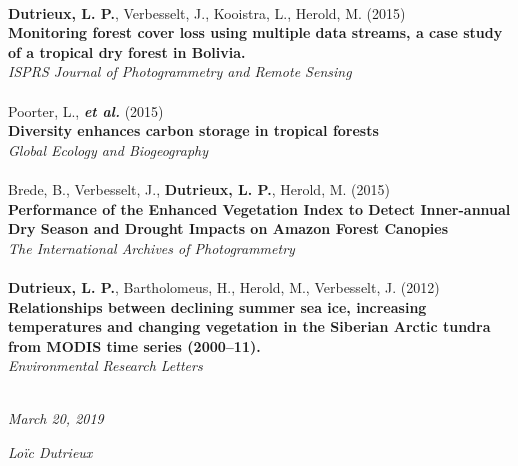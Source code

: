 \documentclass[]{friggeri-cv}
\begin{document}
    \\
    \textbf{Dutrieux, L. P.}, Verbesselt, J., Kooistra, L., Herold, M. (2015)\\
    \textbf{Monitoring forest cover loss using multiple data streams, a case study of a tropical dry forest in Bolivia.}\\
    \textit{ISPRS Journal of Photogrammetry and Remote Sensing}\\
    \\
    Poorter, L., \textbf{\textit{et al.}} (2015)\\
    \textbf{Diversity enhances carbon storage in tropical forests}\\
    \textit{Global Ecology and Biogeography}\\
    \\
    Brede, B., Verbesselt, J., \textbf{Dutrieux, L. P.}, Herold, M. (2015)\\
    \textbf{Performance of the Enhanced Vegetation Index to Detect Inner-annual Dry Season and Drought Impacts on Amazon Forest Canopies}\\
    \textit{The International Archives of Photogrammetry}\\
    \\
    \textbf{Dutrieux, L. P.}, Bartholomeus, H., Herold, M., Verbesselt, J. (2012)\\
    \textbf{Relationships between declining summer sea ice, increasing temperatures and changing vegetation in the Siberian Arctic tundra from MODIS time series (2000–11).}\\
    \textit{Environmental Research Letters}\\
    \\


\begin{flushleft}
\emph{March 20, 2019}
\end{flushleft}
\begin{flushright}
\emph{Lo\"{i}c Dutrieux}
\end{flushright}
\end{document}
